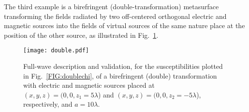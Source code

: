 \documentclass[journal,transaction]{IEEEtran}
\newcommand{\figref}{Fig.~\ref}
\begin{document}
The third example is a birefringent (double-transformation) metasurface transforming the fields radiated by two off-centered orthogonal electric and magnetic sources into the fields of virtual sources of the same nature place at the position of the other source, as illustrated in \figref{FIG:double}.

\begin{figure}[!h]
    \centering
         \texttt{[image: double.pdf]}{
        }
        \caption{Full-wave description and validation, for the susceptibilities plotted in \figref{FIG:doublechi}, of a birefringent (double) transformation with electric and magnetic sources placed at $(x,y,z)=(0,0,z_1=5\lambda$) and $(x,y,z)=(0,0,z_2=-5\lambda$), respectively, and $a=10\lambda$.}
   \label{FIG:double}
\end{figure}
\end{document}
